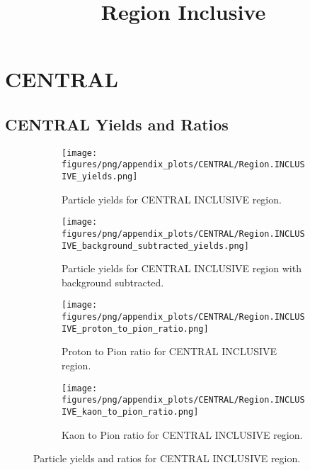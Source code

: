     
        \section{CENTRAL}
        
                \subsection{CENTRAL Yields and Ratios}
                \begin{figure}[H]
                    \title{Region Inclusive}
                    \begin{subfigure}[b]{0.5\textwidth}
                        \centering
                        \texttt{[image: figures/png/appendix\_plots/CENTRAL/Region.INCLUSIVE\_yields.png]}
                        \caption{Particle yields for CENTRAL INCLUSIVE region.}
                        \label{fig:appendix_CENTRAL_INCLUSIVE_Inclusive_Yields}
                    \end{subfigure}
                    \begin{subfigure}[b]{0.5\textwidth}
                        \centering
                        \texttt{[image: figures/png/appendix\_plots/CENTRAL/Region.INCLUSIVE\_background\_subtracted\_yields.png]}
                        \caption{Particle yields for CENTRAL INCLUSIVE region with background subtracted.}
                        \label{fig:appendix_CENTRAL_INCLUSIVE_Inclusive_Yields_Background_Subtracted}
                    \end{subfigure}
                    \begin{subfigure}[b]{0.5\textwidth}
                        \centering
                        \texttt{[image: figures/png/appendix\_plots/CENTRAL/Region.INCLUSIVE\_proton\_to\_pion\_ratio.png]}
                        \caption{Proton to Pion ratio for CENTRAL INCLUSIVE region.}
                        \label{fig:appendix_CENTRAL_INCLUSIVE_Proton_to_Pion_Ratio}
                    \end{subfigure}
                    \begin{subfigure}[b]{0.5\textwidth}
                        \centering
                        \texttt{[image: figures/png/appendix\_plots/CENTRAL/Region.INCLUSIVE\_kaon\_to\_pion\_ratio.png]}
                        \caption{Kaon to Pion ratio for CENTRAL INCLUSIVE region.}
                        \label{fig:appendix_CENTRAL_INCLUSIVE_Kaon_to_Pion_Ratio}
                    \end{subfigure}
                    \caption{Particle yields and ratios for CENTRAL INCLUSIVE region.}
                    \label{fig:appendix_CENTRAL_INCLUSIVE_Inclusive_Yields_and_Ratios}
                \end{figure}
